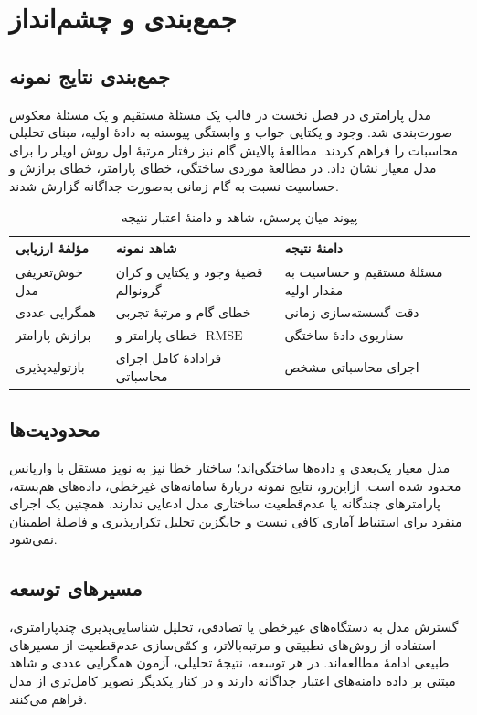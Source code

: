 \chapter{جمع‌بندی و چشم‌انداز}
\label{chap5}

\section{جمع‌بندی نتایج نمونه}

مدل پارامتری در فصل نخست در قالب یک مسئلهٔ مستقیم و یک مسئلهٔ معکوس صورت‌بندی شد. وجود و یکتایی جواب و وابستگی پیوسته به دادهٔ اولیه، مبنای تحلیلی محاسبات را فراهم کردند. مطالعهٔ پالایش گام نیز رفتار مرتبهٔ اول روش اویلر را برای مدل معیار نشان داد. در مطالعهٔ موردی ساختگی، خطای پارامتر، خطای برازش و حساسیت نسبت به گام زمانی به‌صورت جداگانه گزارش شدند.

\begin{table}[htbp]
  \centering
  \begin{tabular}{p{3.1cm}p{4.5cm}p{4.1cm}}
    \toprule
    مؤلفهٔ ارزیابی & شاهد نمونه & دامنهٔ نتیجه \\
    \midrule
    خوش‌تعریفی مدل
    & قضیهٔ وجود و یکتایی و کران گرونوالم
    & مسئلهٔ مستقیم و حساسیت به مقدار اولیه \\
    همگرایی عددی
    & خطای گام و مرتبهٔ تجربی
    & دقت گسسته‌سازی زمانی \\
    برازش پارامتر
    & خطای پارامتر و $\operatorname{RMSE}$
    & سناریوی دادهٔ ساختگی \\
    بازتولیدپذیری
    & فرادادهٔ کامل اجرای محاسباتی
    & اجرای محاسباتی مشخص \\
    \bottomrule
  \end{tabular}
  \caption{پیوند میان پرسش، شاهد و دامنهٔ اعتبار نتیجه}
  \label{tab:evidence-map}
\end{table}

\section{محدودیت‌ها}

مدل معیار یک‌بعدی و داده‌ها ساختگی‌اند؛ ساختار خطا نیز به نویز مستقل با واریانس محدود شده است. ازاین‌رو، نتایج نمونه دربارهٔ سامانه‌های غیرخطی، داده‌های هم‌بسته، پارامترهای چندگانه یا عدم‌قطعیت ساختاری مدل ادعایی ندارند. همچنین یک اجرای منفرد برای استنباط آماری کافی نیست و جایگزین تحلیل تکرارپذیری و فاصلهٔ اطمینان نمی‌شود.

\section{مسیرهای توسعه}

گسترش مدل به دستگاه‌های غیرخطی یا تصادفی، تحلیل شناسایی‌پذیری چندپارامتری، استفاده از روش‌های تطبیقی و مرتبه‌بالاتر، و کمّی‌سازی عدم‌قطعیت از مسیرهای طبیعی ادامهٔ مطالعه‌اند. در هر توسعه، نتیجهٔ تحلیلی، آزمون همگرایی عددی و شاهد مبتنی بر داده دامنه‌های اعتبار جداگانه دارند و در کنار یکدیگر تصویر کامل‌تری از مدل فراهم می‌کنند.
